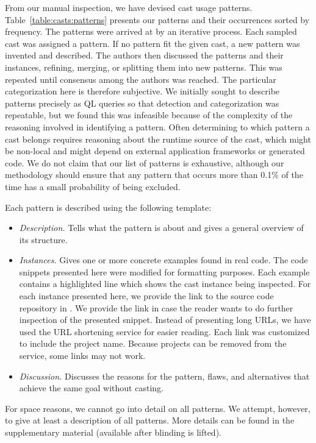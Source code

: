 From our manual inspection,
we have devised \nPattern{} cast usage patterns.
Table~\ref{table:casts:patterns} presents our patterns and their occurrences sorted by frequency.
%
%
The patterns were arrived at by an iterative process. Each sampled cast was
assigned a pattern. If no pattern fit the given cast, a new pattern was
invented and described.
The authors then discussed the patterns and their instances, refining,
merging, or splitting them into new patterns. This was repeated until
consensus among the authors was reached.
The particular categorization here is therefore subjective.
%
We initially sought to describe patterns precisely as QL queries so that
detection and categorization was repeatable, but we found
this was infeasible because of the complexity of the reasoning involved in
identifying a pattern. Often determining to which pattern a cast belongs
requires reasoning about the runtime source of the cast, which might be
non-local and might depend on external application frameworks or generated
code.
%
We do not claim that our list of patterns is exhaustive, although our
methodology should ensure that any pattern that occurs more than 0.1\% of the
time has a small probability of being excluded.

Each pattern is described using the following template:

\begin{itemize}
\item \textit{Description.}
Tells what the pattern is about and gives a general overview of its structure.

\item \textit{Instances.}
Gives one or more concrete examples found in real code.
The code snippets presented here were modified for formatting purposes.
Each example contains a highlighted line which shows the cast instance being inspected.
For each instance presented here, we provide the link to the source code repository in \lgtm{}.
We provide the link in case the reader wants to do further inspection
of the presented snippet.
Instead of presenting long \lgtm{} URLs,
we have used the URL shortening service
\href{https://bitly.com/}{\bitly} for easier reading.
Each \bitly{} link was customized to include the project name.
Because projects can be removed from the \lgtm{} service,
some links may not work.

\item \textit{Discussion.}
  Discusses the reasons for the pattern, flaws, and alternatives
    that achieve the same goal without casting.

\end{itemize}

For space reasons, we cannot go into detail on all patterns.
We attempt, however, to give at least a description of all patterns.
More details can be found in the supplementary material
(available after blinding is lifted).





